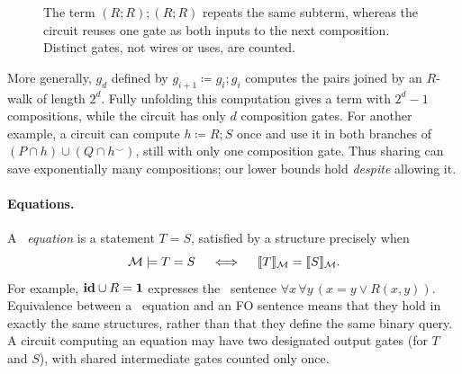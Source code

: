 \begin{figure}[H]
\centering
{}
\caption{The term $(R;R);(R;R)$ repeats the same subterm, whereas
 the circuit reuses one gate as both inputs to the next composition.
 Distinct gates, not wires or uses, are counted.}
\label{fig:term-vs-circuit}
\end{figure}

More generally, $g_d$ defined by
$g_{i+1}\coloneqq g_i;g_i$ computes the pairs joined by an $R$-walk of length
$2^d$. Fully unfolding this computation gives a term with $2^d-1$
compositions, while the circuit has only $d$ composition gates.
For another example, a circuit can compute $h\coloneqq R;S$ once and use it
in both branches of $(P\cap h)\cup(Q\cap h^\smile)$, still with only
one composition gate. Thus sharing can save exponentially many
compositions; our lower bounds hold \emph{despite} allowing it.

\paragraph{Equations.}
A \emph{\CoR\ equation} is a statement $T=S$, satisfied by a
structure precisely when
\[
 \mathcal M\models T=S
  \quad\iff\quad
 \llbracket T\rrbracket_{\mathcal M}=\llbracket S\rrbracket_{\mathcal M}.
\]
For example, $\mathbf{id}\cup R=\mathbf{1}$ expresses the \FOtwo\ sentence
$\forall x\,\forall y\,(x=y\lor R(x,y))$. Equivalence between a
\CoR\ equation and an FO sentence means that they hold in exactly
the same structures, rather than that they define the same binary query.
A circuit computing an equation may have two designated output gates
(for $T$ and $S$), with shared intermediate gates counted only once.

